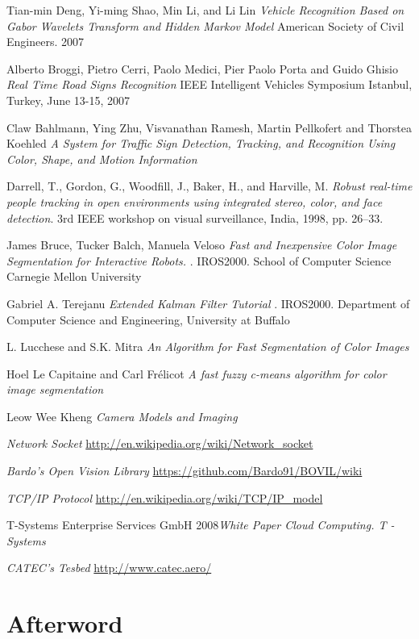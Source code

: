 \documentclass[11pt, oneside]{book} %
\begin{document}
\begin{thebibliography}{9}
 Tian-min Deng, Yi-ming Shao, Min Li, and Li Lin \textit{Vehicle Recognition Based on Gabor Wavelets Transform and Hidden Markov Model} American Society of Civil Engineers. 2007
 
 Alberto Broggi, Pietro Cerri, Paolo Medici, Pier Paolo Porta and Guido Ghisio  \textit{Real Time Road Signs Recognition} IEEE Intelligent Vehicles Symposium Istanbul, Turkey, June 13-15, 2007

 Claw Bahlmann, Ying Zhu, Visvanathan Ramesh, Martin Pellkofert and Thorstea Koehled  \textit{A System for Traffic Sign Detection, Tracking, and 	Recognition Using Color, Shape, and Motion Information}

 Darrell, T., Gordon, G., Woodﬁll, J., Baker, H., and Harville, M. \textit{Robust real-time people tracking in open environments using integrated stereo, color, and face detection}. 3rd IEEE workshop on visual surveillance, India, 1998, pp. 26–33.

 James Bruce, Tucker Balch, Manuela Veloso  \textit{Fast and Inexpensive Color Image Segmentation for Interactive Robots.} . IROS2000. School of Computer Science Carnegie Mellon University

 Gabriel A. Terejanu \textit{Extended Kalman Filter Tutorial} . IROS2000. Department of Computer Science and Engineering, University at Buffalo

 L. Lucchese and S.K. Mitra \textit{An Algorithm for Fast Segmentation of Color Images}

 Hoel Le Capitaine and Carl Frélicot \textit{A fast fuzzy c-means algorithm for color image segmentation}

  Leow Wee Kheng \textit{Camera Models and Imaging}

 \textit{Network Socket} \url{http://en.wikipedia.org/wiki/Network_socket}

 \textit{Bardo's Open Vision Library} \url{https://github.com/Bardo91/BOVIL/wiki}

 \textit{TCP/IP Protocol}  \url{http://en.wikipedia.org/wiki/TCP/IP_model}

 T-Systems Enterprise Services GmbH 2008\textit{White Paper Cloud Computing. T - Systems} 

 \textit {CATEC's Tesbed} \url{http://www.catec.aero/}

\end{thebibliography}

\backmatter

\chapter{Afterword}
\end{document}
